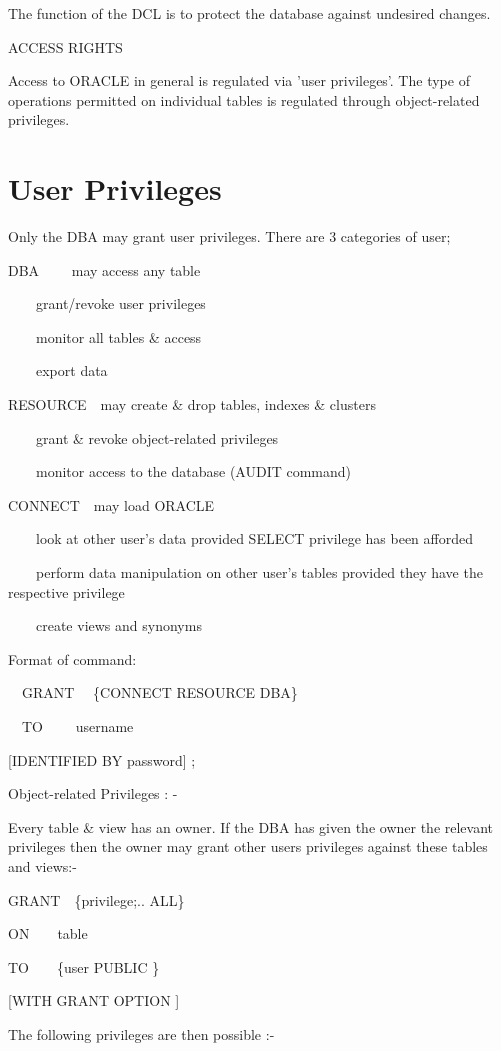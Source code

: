 The function of the DCL is to protect the database against undesired changes.

ACCESS RIGHTS

Access to ORACLE in general is regulated via 'user privileges'.  The type of operations permitted on individual tables is regulated through object-related privileges.

\section{User Privileges}
Only the DBA may grant user privileges. There are 3 categories of user;

DBA  \ \ \ \ may access any table

\ \ \ \ grant/revoke user privileges

\ \ \ \ monitor all tables \& access

\ \ \ \ export data

RESOURCE\ \ may create \& drop tables, indexes \& clusters

\ \ \ \ grant \& revoke object-related privileges

\ \ \ \ monitor access to the database (AUDIT command)

CONNECT\ \ may load ORACLE

\ \ \ \ look at other user's data provided SELECT privilege has been afforded 

\ \ \ \ perform data manipulation on other user's tables provided they have the respective privilege

\ \ \ \ create views and synonyms

Format of command:

 \ \ GRANT \ \ \{CONNECT RESOURCE {\textbar} DBA\}

 \ \ TO \ \ \ \ username

[IDENTIFIED BY password] ;

Object-related Privileges : -

Every table \& view has an owner.  If the DBA has given the owner the relevant privileges then the owner may grant other users privileges against these tables and views:-

GRANT\ \ \{privilege;.. {\textbar} ALL\}

ON\ \ \ \  table

TO\ \ \ \ \{user {\textbar} PUBLIC \}

[WITH GRANT OPTION ]

The following privileges are then possible :-

